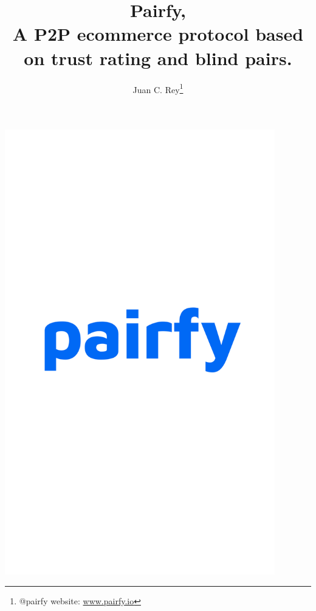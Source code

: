 \documentclass[12pt]{article}
\begin{document}
\begin{titlepage}
    \centering

     \includegraphics[width=0.88\textwidth, keepaspectratio]{arka-cover.png}
    
\end{titlepage}


\renewenvironment{abstract}
 {\small
  \begin{center}
  \bfseries \abstractname\vspace{-.5em}\vspace{0pt}
  \end{center}
  \list{}{
    \setlength{\leftmargin}{.5cm}%
    \setlength{\rightmargin}{\leftmargin}%
  }%
  \item\relax}
 {\endlist}
 

\title{\textbf{Pairfy,\\A P2P ecommerce protocol based on trust rating and blind pairs. }}
\author{Juan C. Rey\footnote{@pairfy  website: \url{www.pairfy.io} }\\}
\end{document}
